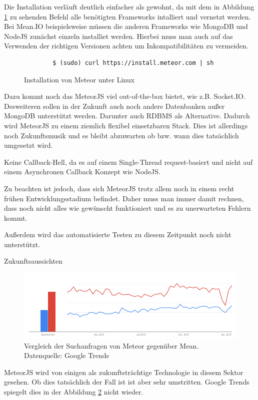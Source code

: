 Die Installation verläuft deutlich einfacher als gewohnt, da mit dem in Abbildung \ref{f:instMeteor} zu sehenden Befehl alle benötigten Frameworks intalliert und vernetzt werden. Bei Mean.IO beispielsweise müssen die anderen Frameworks wie MongoDB und NodeJS zunächst einzeln installiet werden. Hierbei muss man auch auf das Verwenden der richtigen Versionen achten um Inkompatibilitäten zu vermeiden.

\begin{figure}[h]
	\centering
	\begin{lstlisting}
		$ (sudo) curl https://install.meteor.com | sh
	\end{lstlisting}
	\caption[instMeteor]{Installation von Meteor unter Linux}
	\label{f:instMeteor}
\end{figure}

\cite{meteor:t3n}
	
Dazu kommt noch das MeteorJS viel out-of-the-box bietet, wie z.B. Socket.IO. Desweiteren sollen in der Zukunft auch noch andere Datenbanken außer MongoDB unterstützt werden. Darunter auch RDBMS als Alternative. Dadurch wird MeteorJS zu einem ziemlich flexibel einsetzbaren Stack. Dies ist allerdings noch Zukunftsmusik und es bleibt abzuwarten ob bzw. wann dies tatsächlich umgesetzt wird.
	
Keine Callback-Hell, da es auf einem Single-Thread request-basiert und nicht auf einem Asynchronen Callback Konzept wie NodeJS.
	
Zu beachten ist jedoch, dass sich MeteorJS trotz allem noch in einem recht frühen Entwicklungsstadium befindet. Daher muss man immer damit rechnen, dass noch nicht alles wie gewünscht funktioniert und es zu unerwarteten Fehlern kommt.
	
Außerdem wird das automatisierte Testen zu diesem Zeitpunkt noch nicht unterstützt.

Zukunftsaussichten

\begin{figure}[h]
	\centering
	\includegraphics[width=0.7\linewidth]{figures/meteor-vs-mean.png}
	\caption{Vergleich der Suchanfragen von Meteor gegenüber Mean. Datenquelle: Google Trends \cite{googleTrends:meteorVsMean}}
	\label{f:mean-frameworks:meteorVsMean}
\end{figure}

MeteorJS wird von einigen als zukunftsträchtige Technologie in diesem Sektor gesehen.
Ob dies tatsächlich der Fall ist ist aber sehr umstritten.
Google Trends spiegelt dies in der Abbildung \ref{f:mean-frameworks:meteorVsMean} nicht wieder.